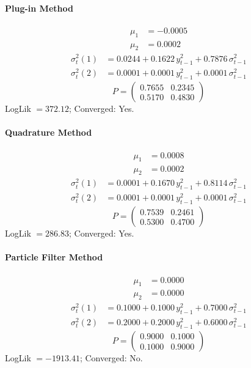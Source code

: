 \documentclass[11pt, a4paper]{article}
\begin{document}
\paragraph{Plug-in Method}
\begin{align}
\mu_{1} &= -0.0005 \\
\mu_{2} &= 0.0002
\end{align}
\begin{align}
\sigma^2_{t}(1) &= 0.0244 + 0.1622\, y_{t-1}^2 + 0.7876\, \sigma^2_{t-1} \\
\sigma^2_{t}(2) &= 0.0001 + 0.0001\, y_{t-1}^2 + 0.0001\, \sigma^2_{t-1}
\end{align}
\begin{equation}
P = \begin{pmatrix} 0.7655 & 0.2345 \\ 0.5170 & 0.4830 \end{pmatrix}
\end{equation}
LogLik $= 372.12$; Converged: Yes.

\paragraph{Quadrature Method}
\begin{align}
\mu_{1} &= 0.0008 \\
\mu_{2} &= 0.0002
\end{align}
\begin{align}
\sigma^2_{t}(1) &= 0.0001 + 0.1670\, y_{t-1}^2 + 0.8114\, \sigma^2_{t-1} \\
\sigma^2_{t}(2) &= 0.0001 + 0.0001\, y_{t-1}^2 + 0.0001\, \sigma^2_{t-1}
\end{align}
\begin{equation}
P = \begin{pmatrix} 0.7539 & 0.2461 \\ 0.5300 & 0.4700 \end{pmatrix}
\end{equation}
LogLik $= 286.83$; Converged: Yes.

\paragraph{Particle Filter Method}
\begin{align}
\mu_{1} &= 0.0000 \\
\mu_{2} &= 0.0000
\end{align}
\begin{align}
\sigma^2_{t}(1) &= 0.1000 + 0.1000\, y_{t-1}^2 + 0.7000\, \sigma^2_{t-1} \\
\sigma^2_{t}(2) &= 0.2000 + 0.2000\, y_{t-1}^2 + 0.6000\, \sigma^2_{t-1}
\end{align}
\begin{equation}
P = \begin{pmatrix} 0.9000 & 0.1000 \\ 0.1000 & 0.9000 \end{pmatrix}
\end{equation}
LogLik $= -1913.41$; Converged: No.
\end{document}
